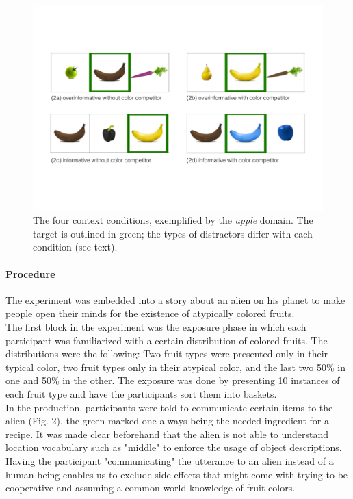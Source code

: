 \documentclass[10pt,letterpaper]{article}
\begin{document}
\begin{figure}[bt!]
\centering
\includegraphics[width=.5\textwidth]{graphs/design_1}
\caption{The four context conditions, exemplified by the \textit{apple} domain. The target is outlined in green; the types of distractors differ with each condition (see text).
}
\label{fig:design}
\end{figure}

\paragraph{Procedure}
The experiment was embedded into a story about an alien on his planet to make people open their minds for the existence of atypically colored fruits.\\The first block in the experiment was the exposure phase in which each participant was familiarized with a certain distribution of colored fruits. The distributions were the following: Two fruit types were presented only in their typical color, two fruit types only in their atypical color, and the last two 50\% in one and 50\% in the other. The exposure was done by presenting 10 instances of each fruit type and have the participants sort them into baskets.\\In the production, participants were told to communicate certain items to the alien (Fig. 2), the green marked one always being the needed ingredient for a recipe. It was made clear beforehand that the alien is not able to understand location vocabulary such as "middle" to enforce the usage of object descriptions. Having the participant "communicating" the utterance to an alien instead of a human being enables us to exclude side effects that might come with trying to be cooperative and assuming a common world knowledge of fruit colors.
\end{document}
